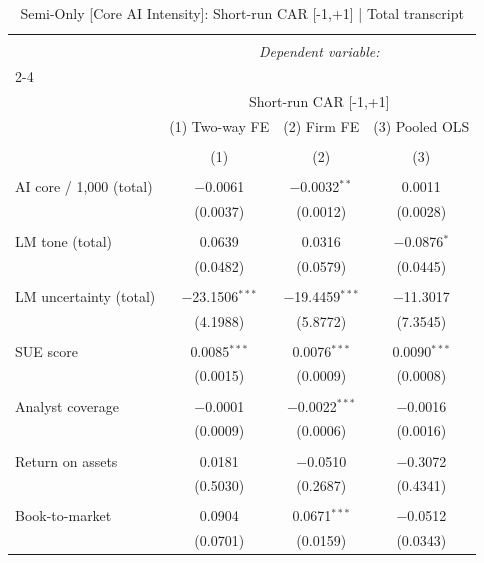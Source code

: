 
\begin{table}[!htbp] \centering 
  \caption{Semi-Only [Core AI Intensity]: Short-run CAR [-1,+1]  |  Total transcript} 
  \label{} 
\begin{tabular}{@{\extracolsep{5pt}}lccc} 
\\[-1.8ex]\hline 
\hline \\[-1.8ex] 
 & \multicolumn{3}{c}{\textit{Dependent variable:}} \\ 
\cline{2-4} 
\\[-1.8ex] & \multicolumn{3}{c}{Short-run CAR [-1,+1]} \\ 
 & (1) Two-way FE & (2) Firm FE & (3) Pooled OLS \\ 
\\[-1.8ex] & (1) & (2) & (3)\\ 
\hline \\[-1.8ex] 
 AI core / 1,000 (total) & $-$0.0061 & $-$0.0032$^{**}$ & 0.0011 \\ 
  & (0.0037) & (0.0012) & (0.0028) \\ 
  & & & \\ 
 LM tone (total) & 0.0639 & 0.0316 & $-$0.0876$^{*}$ \\ 
  & (0.0482) & (0.0579) & (0.0445) \\ 
  & & & \\ 
 LM uncertainty (total) & $-$23.1506$^{***}$ & $-$19.4459$^{***}$ & $-$11.3017 \\ 
  & (4.1988) & (5.8772) & (7.3545) \\ 
  & & & \\ 
 SUE score & 0.0085$^{***}$ & 0.0076$^{***}$ & 0.0090$^{***}$ \\ 
  & (0.0015) & (0.0009) & (0.0008) \\ 
  & & & \\ 
 Analyst coverage & $-$0.0001 & $-$0.0022$^{***}$ & $-$0.0016 \\ 
  & (0.0009) & (0.0006) & (0.0016) \\ 
  & & & \\ 
 Return on assets & 0.0181 & $-$0.0510 & $-$0.3072 \\ 
  & (0.5030) & (0.2687) & (0.4341) \\ 
  & & & \\ 
 Book-to-market & 0.0904 & 0.0671$^{***}$ & $-$0.0512 \\ 
  & (0.0701) & (0.0159) & (0.0343) \\ 

\end{tabular}
\end{table}
